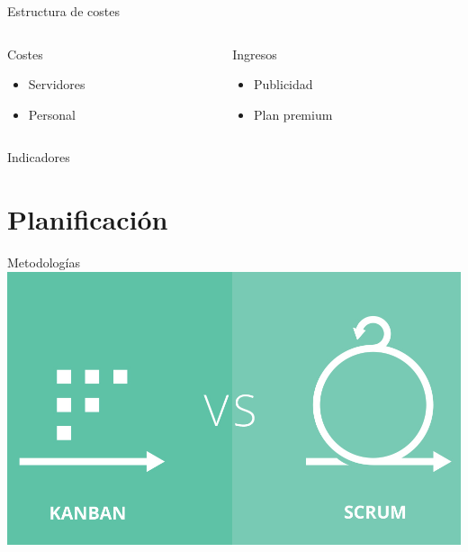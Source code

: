 \documentclass[12pt]{beamer}
\begin{document}
		\begin{frame}{Estructura de costes}
			\begin{columns}[onlytextwidth]
				\begin{column}{0.45\textwidth}
					\begin{block}{Costes}
						\begin{itemize}
							\item Servidores
							\item Personal
						\end{itemize}
					\end{block}
				\end{column}
				\begin{column}{0.45\textwidth}
					\begin{block}{Ingresos}
						\begin{itemize}
							\item Publicidad
							\item Plan premium
						\end{itemize}
					\end{block}
				\end{column}
			\end{columns}
		\end{frame}

		\begin{frame}{Indicadores}
			\begin{center}
			\end{center}
        \end{frame}
	
	\section{Planificación}
		\begin{frame}{Metodologías}
			\includegraphics[width=\textwidth,height=0.8\textheight,keepaspectratio]{img/scrum/scrum_vs_kanban}
		\end{frame}
\end{document}
